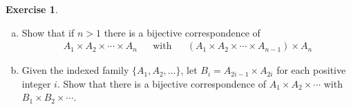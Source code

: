 \documentclass[11pt,a4paper,twoside]{article}
\theoremstyle{definition}
\newcounter{excounter}
\newtheorem{exercise}[excounter]{Exercise}
\begin{document}
\begin{exercise}\hfill

  \begin{enumerate}[(a)]
  \item Show that if $n > 1$ there is a bijective correspondence of
    \begin{align*}
      A_1 \times A_2 \times \dotsb \times A_n &&\text{with}&& \left( A_1 \times A_2 \times \dotsb \times A_{n - 1} \right) \times A_n
    \end{align*}
  \item Given the indexed family $\big\{ A_1, A_2, \dotsc \big\}$, let $B_i = A_{2 i - 1} \times A_{2 i}$ for each positive integer $i$.
    Show that there is a bijective correspondence of $A_1 \times A_2 \times \dotsb$ with $B_1 \times B_2 \times \dotsb$.
  \end{enumerate}

\end{exercise}
\end{document}

